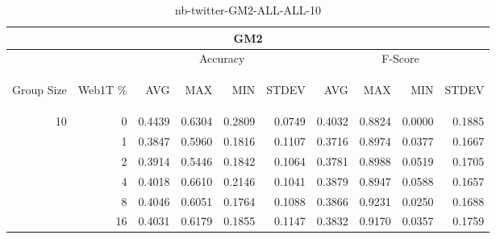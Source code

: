 \begin{center}
\begin{table}[htbp]
\begin{tabular}{ | r | r | r | r | r | r | r | r | r | r |}
\hline
\multicolumn{10}{|c|}{GM2}\\
\hline
 & & \multicolumn{4}{|c|}{Accuracy} & \multicolumn{4}{|c|}{F-Score}\\ \cline{3-10}
\begin{sideways}Group Size\end{sideways} & \begin{sideways}Web1T \%\end{sideways} & \begin{sideways}AVG\end{sideways} & \begin{sideways}MAX\end{sideways} & \begin{sideways}MIN\end{sideways} & \begin{sideways}STDEV\end{sideways} & \begin{sideways}AVG\end{sideways} & \begin{sideways}MAX\end{sideways} & \begin{sideways}MIN\end{sideways} & \begin{sideways}STDEV\end{sideways}\\
\hline
\multirow{5}{*}{10}
 & 0 & 0.4439 & 0.6304 & 0.2809 & 0.0749 & 0.4032 & 0.8824 & 0.0000 & 0.1885\\ \cline{2-10}
 & 1 & 0.3847 & 0.5960 & 0.1816 & 0.1107 & 0.3716 & 0.8974 & 0.0377 & 0.1667\\ \cline{2-10}
 & 2 & 0.3914 & 0.5446 & 0.1842 & 0.1064 & 0.3781 & 0.8988 & 0.0519 & 0.1705\\ \cline{2-10}
 & 4 & 0.4018 & 0.6610 & 0.2146 & 0.1041 & 0.3879 & 0.8947 & 0.0588 & 0.1657\\ \cline{2-10}
 & 8 & 0.4046 & 0.6051 & 0.1764 & 0.1088 & 0.3866 & 0.9231 & 0.0250 & 0.1688\\ \cline{2-10}
 & 16 & 0.4031 & 0.6179 & 0.1855 & 0.1147 & 0.3832 & 0.9170 & 0.0357 & 0.1759\\ \cline{2-10}
\hline
\end{tabular}
\caption{nb-twitter-GM2-ALL-ALL-10}
\label{table:nb-twitter-GM2-ALL-ALL-10}
\end{table}
\end{center}

